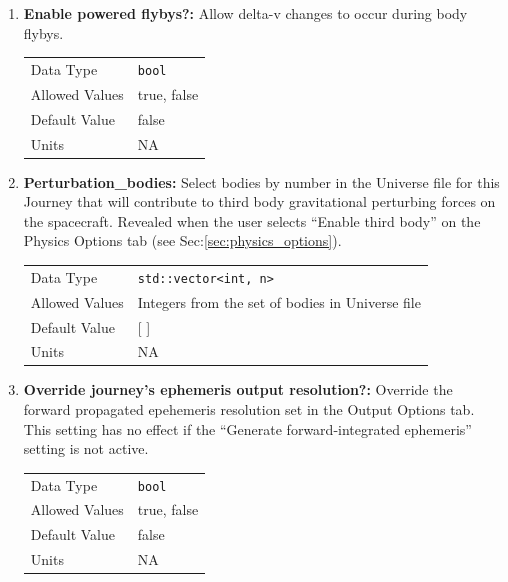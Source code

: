 \begin{enumerate}
    \item \textbf{Enable powered flybys?:} Allow delta-v changes to occur during body flybys.%

        \begin{table}[H]
            \hspace{2cm}
            \begin{tabular}{ll}
            Data Type & \verb|bool| \\
            Allowed Values & true, false \\
            Default Value & false \\
            Units & NA
            \end{tabular}
        \end{table}

    \item \textbf{Perturbation\_bodies:} Select bodies by number in the Universe file for this Journey that will contribute to third body gravitational perturbing forces on the spacecraft. Revealed when the user selects ``Enable third body'' on the Physics Options tab (see Sec:\ref{sec:physics_options}).
    
        \begin{table}[H]
            \hspace{2cm}
            \begin{tabular}{ll}
            Data Type & \verb|std::vector<int, n>| \\
            Allowed Values & Integers from the set of bodies in Universe file \\
            Default Value & [ ] \\
            Units & NA
            \end{tabular}
        \end{table}

    \item \textbf{Override journey's ephemeris output resolution?:} Override the forward propagated epehemeris resolution set in the Output Options tab. This setting has no effect if the ``Generate forward-integrated ephemeris'' setting is not active.

        \begin{table}[H]
            \hspace{2cm}
            \begin{tabular}{ll}
            Data Type & \verb|bool| \\
            Allowed Values & true, false \\
            Default Value & false \\
            Units & NA
            \end{tabular}
        \end{table}


\end{enumerate}

